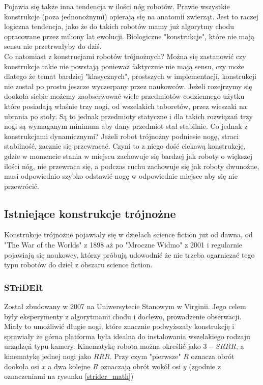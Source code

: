 \documentclass[a4paper,13pt]{article}
\begin{document}
Pojawia się także inna tendencja w ilości nóg robotów. Prawie wszystkie konstrukcje (poza jednonożnymi) opierają się na anatomii zwierząt. Jest to raczej logiczna tendencja, jako że do takich robotów mamy już algorytmy chodu opracowane przez miliony lat ewolucji. Biologiczne "konstrukcje", które nie mają sensu nie przetrwałyby do dziś. \cite{history}\\

Co natomiast z konstrucjami robotów trójnożnych? Można się zastanowić czy konstrukcje takie nie powstają ponieważ faktycznie nie mają sensu, czy może dlatego że temat bardziej "klasycznych", prostszych w implementacji, konstrukcji nie został po prostu jeszcze wyczerpany przez naukowców. Jeżeli rozejrzymy się dookoła siebie możemy zaobserwować wiele przedmiotów codziennego użytku które posiadają właśnie trzy nogi, od wszelakich taboretów, przez wieszaki na ubrania po stoły. Są to jednak przedmioty statyczne i dla takich rozwiązań trzy nogi są wymaganym minimum aby dany przedmiot stał stabilnie. Co jednak z konstrukcjami dynamicznymi? Jeżeli robot trójnożny podniesie nogę, straci stabilność, zacznie się przewracać. Czyni to z niego dość ciekawą konstrukcję, gdzie w momencie stania w miejscu zachowuje się bardzej jak roboty o większej ilości nóg, nie przewraca się, a podczas ruchu zachowuje się jak roboty dwunożne, musi odpowiednio szybko odstawić nogę w odpowiednie miejsce aby się nie przewrócić.\\

\subsection{Istniejące konstrukcje trójnożne}
Konstrukcje trójnożne pojawiały się w dziełach science fiction już od dawna, od "The War of the Worlds" z 1898 aż po "Mroczne Widmo" z 2001 i regularnie pojawiają się naukowcy, którzy próbują udowodnić że nie trzeba ogarniczać tego typu robotów do dzieł z obszaru science fiction.
\subsubsection{STriDER} 
Został zbudowany w 2007 na Uniwersytecie Stanowym w Virginii. Jego celem były eksperymenty z algorytmami chodu i doclewo, prowadzenie obserwacji. Miały to umożliwić długie nogi, które znacznie podwyższały konstrukcję i sprawiały że górna platforma była idealna do instalowania wszelakiego rodzaju urządzęń typu kamery. Kinematykę robota można określić jako $3-SRRR$, a kinematykę jednej nogi jako $RRR$. Przy czym "pierwsze" $R$ oznacza obrót dookoła osi $x$ a dwa kolejne $R$ oznaczają obrót wokół osi $y$ (zgodnie z oznaczeniami na rysunku \ref{strider_math})  \cite{strider}\\
\end{document}
